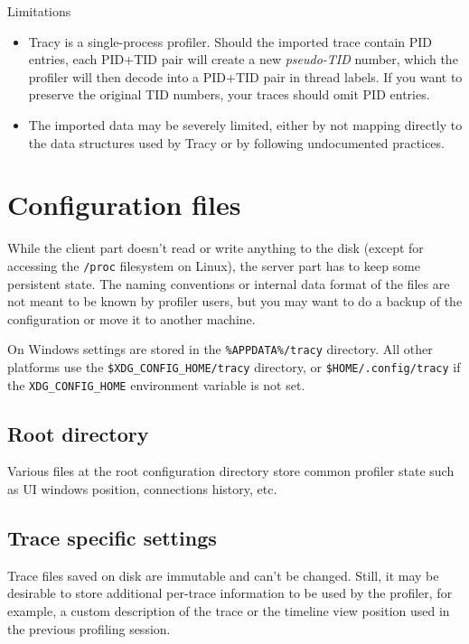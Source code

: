 \documentclass[hidelinks,titlepage,a4paper,twoside]{article}
\begin{document}
\begin{bclogo}[
noborder=true,
couleur=black!5,
logo=\bcattention
]{Limitations}
\begin{itemize}
\item Tracy is a single-process profiler. Should the imported trace contain PID entries, each PID+TID pair will create a new \emph{pseudo-TID} number, which the profiler will then decode into a PID+TID pair in thread labels. If you want to preserve the original TID numbers, your traces should omit PID entries.
\item The imported data may be severely limited, either by not mapping directly to the data structures used by Tracy or by following undocumented practices.
\end{itemize}
\end{bclogo}

\section{Configuration files}
\label{configurationfiles}

While the client part doesn't read or write anything to the disk (except for accessing the \texttt{/proc} filesystem on Linux), the server part has to keep some persistent state. The naming conventions or internal data format of the files are not meant to be known by profiler users, but you may want to do a backup of the configuration or move it to another machine.

On Windows settings are stored in the \texttt{\%APPDATA\%/tracy} directory. All other platforms use the \texttt{\$XDG\_CONFIG\_HOME/tracy} directory, or \texttt{\$HOME/.config/tracy} if the \texttt{XDG\_CONFIG\_HOME} environment variable is not set.

\subsection{Root directory}

Various files at the root configuration directory store common profiler state such as UI windows position, connections history, etc.

\subsection{Trace specific settings}
\label{tracespecific}

Trace files saved on disk are immutable and can't be changed. Still, it may be desirable to store additional per-trace information to be used by the profiler, for example, a custom description of the trace or the timeline view position used in the previous profiling session.
\end{document}
